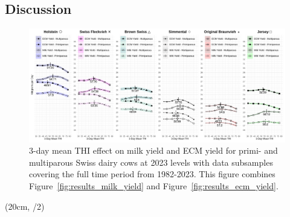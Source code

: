 \newpage
\begin{landscape}
    \thispagestyle{empty}
    \section{Discussion}\label{sec:discussion}
    \begin{figure}[ht]
        \centering
        \includegraphics[width=0.85\paperheight]{thesis/figures/results/ecm_milk_combined.png}
        \caption{3-day mean THI effect on milk yield and ECM yield for primi- and multiparous Swiss dairy cows at 2023 levels with data subsamples covering the full time period from 1982-2023. This figure combines Figure~\ref{fig:results_milk_yield} and Figure~\ref{fig:results_ecm_yield}.}
        \label{fig:ecm_milk_combined}
    \end{figure}
    
    \begin{textblock*}{2cm}(20cm, \dimexpr\paperheight/2)
    \end{textblock*}
\end{landscape}
\newpage

